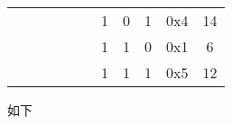 \documentclass[11pt]{homework}
\begin{document}
\begin{arabicparts}
{\begin{tabular}{|c|c|c|c|c|c|c|c|c|c|c|}
            \cline{7-11}
                                     &                                                                        &                             &                                                                   &                                                                    &                                                                      & 1                        & 0     & 1         & 0x4 & 14            \\
            \cline{7-11}
                                     &                                                                        &                             &                                                                   &                                                                    &                                                                      & 1                        & 1     & 0         & 0x1 & 6             \\
            \cline{7-11}
                                     &                                                                        &                             &                                                                   &                                                                    &                                                                      & 1                        & 1     & 1         & 0x5 & 12            \\
            \hline
        \end{tabular}
    }
    \newpage
    \questionpart 如下


\end{arabicparts}
\end{document}
